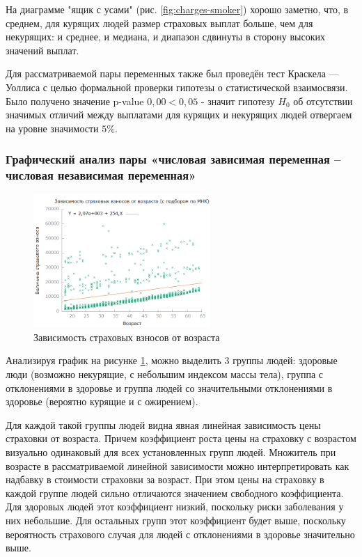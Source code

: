 \documentclass[a4paper,12pt]{article}
\begin{document}
На диаграмме "ящик с усами" (рис. \ref{fig:charges-smoker}) хорошо заметно, что, в среднем, для курящих людей размер страховых выплат больше, чем для некурящих: и среднее, и медиана, и диапазон сдвинуты в сторону высоких значений выплат.

Для рассматриваемой пары переменных также был проведён тест Краскела — Уоллиса с целью формальной проверки гипотезы о статистической взаимосвязи. Было получено значение p-value $0,00 < 0,05$ - значит гипотезу $H_0$ об отсутствии значимых отличий между выплатами для курящих и некурящих людей отвергаем на уровне значимости $5\%$.

\subsubsection{Графический анализ пары «числовая зависимая переменная – числовая независимая переменная»}

\begin{figure}[H]
	\includegraphics[width=0.6\textwidth]{../[graphics]/age-price.png}
	\centering
	\caption{Зависимость страховых взносов от возраста}
	\label{fig:age-price}
\end{figure}

Анализируя график на рисунке \ref{fig:age-price}, можно выделить 3 группы людей: здоровые люди (возможно некурящие, с небольшим индексом массы тела), группа с отклонениями в здоровье и группа людей со значительными отклонениями в здоровье (вероятно курящие и с ожирением). 

Для каждой такой группы людей видна явная линейная зависимость цены страховки от возраста. Причем коэффициент роста цены на страховку с возрастом визуально одинаковый для всех установленных групп людей. Множитель при возрасте в рассматриваемой линейной зависимости можно интерпретировать как надбавку в стоимости страховки за возраст. При этом цены на страховку в каждой группе людей сильно отличаются значением свободного коэффициента. Для здоровых людей этот коэффициент низкий, поскольку риски заболевания у них небольшие. Для остальных групп этот коэффициент будет выше, поскольку вероятность страхового случая для людей с отклонениями в здоровье значительно выше. 
\end{document}
